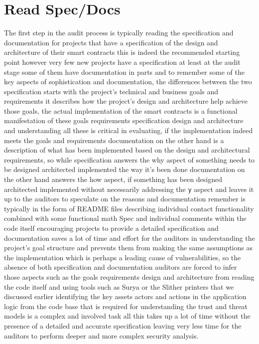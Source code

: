 \section{Read Spec/Docs}

The first step in the audit process is typically reading the specification and documentation for projects that have a specification of the design and architecture of their smart contracts this is indeed the recommended starting point however very few new projects have a specification at least at the audit stage some of them have documentation in parts and to remember some of the key aspects of sophistication and documentation, the differences between the two specification starts with the project's technical and business goals and requirements it describes how the project's design and architecture help achieve those goals, the actual implementation of the smart contracts is a functional manifestation of these goals requirements specification design and architecture and understanding all these is critical in evaluating, if the implementation indeed meets the goals and requirements documentation on the other hand is a description of what has been implemented based on the design and architectural requirements, so while specification answers the why aspect of something needs to be designed architected implemented the way it's been done documentation on the other hand answers the how aspect, if something has been designed architected implemented without necessarily addressing the \verb|y| aspect and leaves it up to the auditors to speculate on the reasons and documentation remember is typically in the form of README files describing individual contact functionality combined with some functional math Spec and individual comments within the code itself encouraging projects to provide a detailed specification and documentation saves a lot of time and effort for the auditors in understanding the project's goal structure and prevents them from making the same assumptions as the implementation which is perhaps a leading cause of vulnerabilities, so the absence of both specification and documentation auditors are forced to infer those aspects such as the goals requirements design and architecture from reading the code itself and using tools such as Surya or the Slither printers that we discussed earlier identifying the key assets actors and actions in the application logic from the code base that is required for understanding the trust and threat models is a complex and involved task all this takes up a lot of time without the presence of a detailed and accurate specification leaving very less time for the auditors to perform deeper and more complex security analysis.

